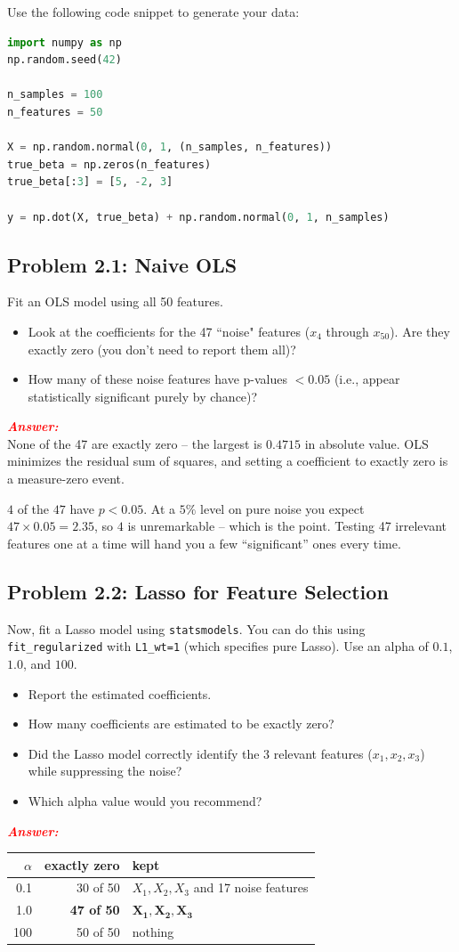 \documentclass[11pt, letterpaper]{article}
\newcommand{\subproblem}[1]{\subsection*{Problem #1}}
\newcommand{\answer}{\textbf{\textit{\textcolor{red}{Answer:}}}\\}
\begin{document}
Use the following code snippet to generate your data:
    \begin{lstlisting}[language=Python]
import numpy as np
np.random.seed(42)

n_samples = 100
n_features = 50

X = np.random.normal(0, 1, (n_samples, n_features))
true_beta = np.zeros(n_features)
true_beta[:3] = [5, -2, 3]

y = np.dot(X, true_beta) + np.random.normal(0, 1, n_samples)\end{lstlisting}

\subproblem{2.1: Naive OLS}
Fit an OLS model using all 50 features.
\begin{itemize}
    \item Look at the coefficients for the 47 ``noise" features ($x_4$ through $x_{50}$). Are they exactly zero (you don't need to report them all)?
    \item How many of these noise features have p-values $< 0.05$ (i.e., appear statistically significant purely by chance)?
\end{itemize}

\answer
None of the 47 are exactly zero -- the largest is $0.4715$ in absolute value. OLS minimizes the
residual sum of squares, and setting a coefficient to exactly zero is a measure-zero event.

$4$ of the $47$ have $p < 0.05$. At a $5\%$ level on pure noise you expect $47 \times 0.05 = 2.35$,
so $4$ is unremarkable -- which is the point. Testing 47 irrelevant features one at a time will hand
you a few ``significant'' ones every time.


\subproblem{2.2: Lasso for Feature Selection}
Now, fit a Lasso model using \texttt{statsmodels}. 
You can do this using \texttt{fit\_regularized} with \texttt{L1\_wt=1} 
(which specifies pure Lasso). Use an alpha of $0.1$, $1.0$, and $100$.
\begin{itemize}
    \item Report the estimated coefficients.
    \item How many coefficients are estimated to be exactly zero?
    \item Did the Lasso model correctly identify the 3 relevant features ($x_1, x_2, x_3$) while suppressing the noise?
    \item Which alpha value would you recommend?
\end{itemize}

\answer
\begin{center}
\begin{tabular}{rrl}
\toprule
$\alpha$ & exactly zero & kept \\
\midrule
0.1 & 30 of 50 & $X_1, X_2, X_3$ and 17 noise features \\
1.0 & \textbf{47 of 50} & $\mathbf{X_1, X_2, X_3}$ \\
100 & 50 of 50 & nothing \\
\bottomrule
\end{tabular}
\end{center}
\end{document}
